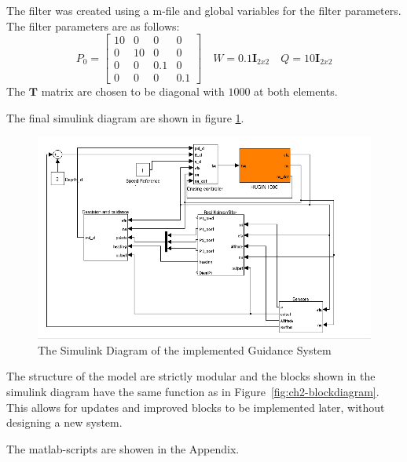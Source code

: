 	The filter was created using a m-file and global variables for the filter parameters. The filter
	parameters are as follows:
	\begin{equation*}
		P_0 = \left [ \begin{matrix}
				10 & 0 & 0 & 0 \\
				0 & 10 & 0 & 0 \\
				0 & 0 & 0.1 & 0 \\
				0 & 0 & 0 & 0.1
				\end{matrix} \right] \quad
		W = 0.1 \mathbf{I}_{2x2} \quad Q = 10 \mathbf{I}_{2x2} 
	\end{equation*}
	The $\mathbf{T}$ matrix are chosen to be diagonal with $1000$ at both elements.

	The final simulink diagram are shown in figure \ref{fig:ch3_simulink}.
	\begin{figure}[htbp]
		\centering
		\includegraphics[width=\textwidth]{pics/simulink}
		\caption{The Simulink Diagram of the implemented Guidance System}
		\label{fig:ch3_simulink}
	\end{figure}
	The structure of the model are strictly modular and the blocks shown in the simulink diagram have the
	same function as in Figure~\ref{fig:ch2-blockdiagram}. This allows for updates and improved blocks
	to be implemented later, without designing a new system.
	
	The matlab-scripts are showen in the Appendix.
	

